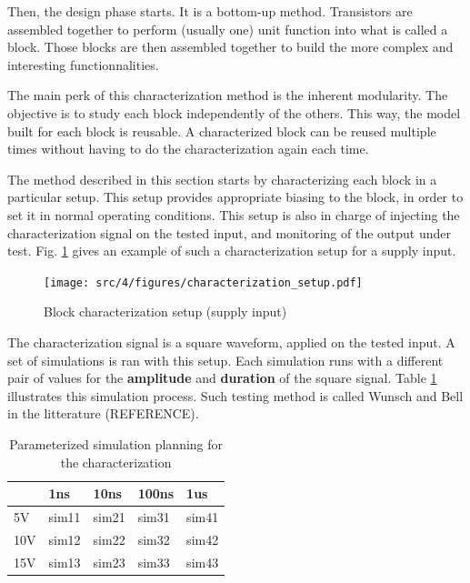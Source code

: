 Then, the design phase starts. It is a bottom-up method.
Transistors are assembled together to perform (usually one) unit function into what is called a \gls{block}.
Those blocks are then assembled together to build the more complex and interesting functionnalities.

The main perk of this characterization method is the inherent modularity.
The objective is to study each block independently of the others.
This way, the model built for each block is reusable.
A characterized block can be reused multiple times without having to do the characterization again each time.

The method described in this section starts by characterizing each block in a particular setup.
This setup provides appropriate biasing to the block, in order to set it in normal operating conditions.
This setup is also in charge of injecting the characterization signal on the tested input, and monitoring of the output under test.
Fig. \ref{block_function_cz} gives an example of such a characterization setup for a supply input.

\begin{figure}[!htbp]
  \centering
  \texttt{[image: src/4/figures/characterization\_setup.pdf]}
  \caption{Block characterization setup (supply input)}
  \label{block_function_cz}
\end{figure}

The characterization signal is a square waveform, applied on the tested input.
A set of simulations is ran with this setup.
Each simulation runs with a different pair of values for the \textbf{amplitude} and \textbf{duration} of the square signal.
Table \ref{parameterized-simulations} illustrates this simulation process.
Such testing method is called Wunsch and Bell in the litterature (REFERENCE).

\begin{table}[!htbp]
\centering
\begin{tabular}{@{}lllll@{}}
\toprule
    & 1ns   & 10ns  & 100ns & 1us   \\ \midrule
5V  & sim11 & sim21 & sim31 & sim41 \\
10V & sim12 & sim22 & sim32 & sim42 \\
15V & sim13 & sim23 & sim33 & sim43 \\ \bottomrule
\end{tabular}
\caption{Parameterized simulation planning for the characterization}
\label{parameterized-simulations}
\end{table}

